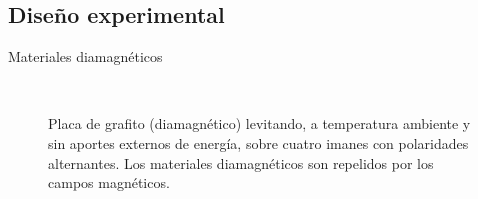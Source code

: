 \documentclass[]{presentation}
\begin{document}
\subsection{Diseño experimental}
\begin{frame}{Materiales diamagnéticos}
\begin{figure}
	\centering
	\,
	\caption{Placa de grafito (diamagnético) levitando, a temperatura ambiente y sin aportes externos de energía, sobre cuatro imanes con polaridades alternantes. Los materiales diamagnéticos son repelidos por los campos magnéticos.}
\end{figure}
\end{frame}
\end{document}

